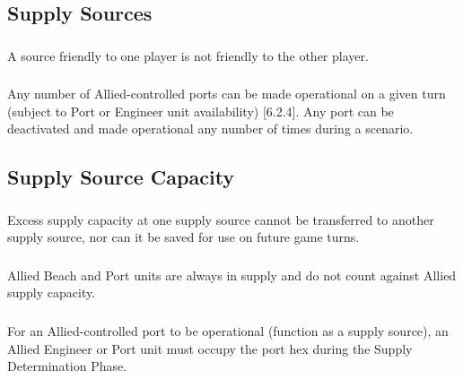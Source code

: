 \subsection{Supply Sources}
\subsubsection{}
A source friendly to one player is not friendly to the other player.

\subsubsection{}
Any number of Allied-controlled ports can be made operational on a given turn (subject to Port or Engineer unit availability) [6.2.4]. Any port can be deactivated and made operational any number of times during a scenario.

\subsection{Supply Source Capacity}
\subsubsection{}
Excess supply capacity at one supply source cannot be transferred to another supply source, nor can it be saved for use on future game turns.

\subsubsection{}
Allied Beach and Port units are always in supply and do not count against Allied supply capacity.

\subsubsection{}
For an Allied-controlled port to be operational (function as a supply source), an Allied Engineer or Port unit must occupy the port hex during the Supply Determination Phase.

